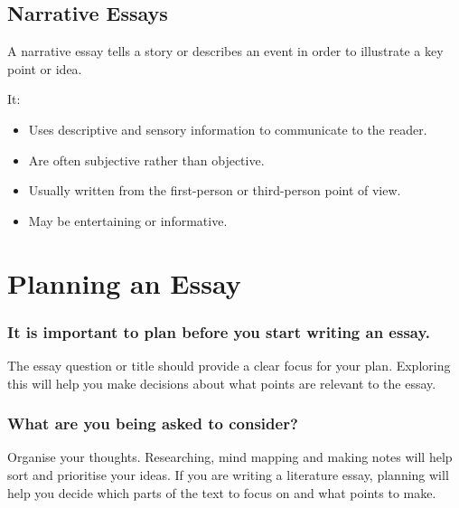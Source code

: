 	\subsection{Narrative Essays}
		A narrative essay tells a story or describes an event in order to illustrate a key point or idea.
		
		It:
		\begin{itemize}
			\item Uses descriptive and sensory information to communicate to the reader.
			\item Are often subjective rather than objective.
			\item Usually written from the first-person or third-person point of view.
			\item May be entertaining or informative.
		\end{itemize}

\section{Planning an Essay}
	\subsubsection{It is important to plan before you start writing an essay.}
		The essay question or title should provide a clear focus for your plan. Exploring this will help you make decisions about what points are relevant to the essay.
	
	\subsubsection{What are you being asked to consider?}
		Organise your thoughts. Researching, mind mapping and making notes will help sort and prioritise your ideas. If you are writing a literature essay, planning will help you decide which parts of the text to focus on and what points to make.
		
